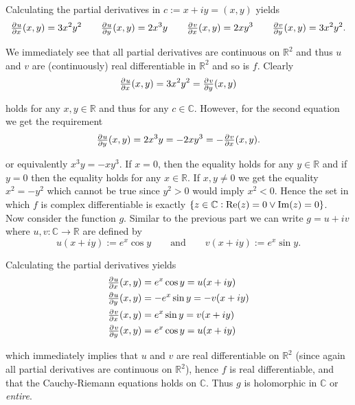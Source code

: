 \begin{enumerate}[label = \textbf{Exercise \arabic*.},wide = 0pt, itemsep=1.5ex]
	Calculating the partial derivatives in $c := x + iy = (x,y)$ yields
	\begin{equation*}
		\pd{u}{x}(x,y) = 3x^2y^2 \qquad \pd{u}{y}(x,y) = 2x^3y \qquad \pd{v}{x}(x,y) = 2xy^3 \qquad \pd{v}{y}(x,y) = 3x^2 y^2.
	\end{equation*}

	We immediately see that all partial derivatives are continuous on $\mathbb{R}^2$ and thus $u$ and $v$ are (continuously) real differentiable in $\mathbb{R}^2$ and so is $f$. Clearly 
	\begin{equation}
		\pd{u}{x}(x,y) = 3x^2 y^2 = \pd{v}{y}(x,y)
	\end{equation}

	\noindent holds for any $x,y \in \mathbb{R}$ and thus for any $c \in \mathbb{C}$. However, for the second equation we get the requirement
	\begin{equation}
		\pd{u}{y}(x,y) = 2x^3y = -2xy^3 = -\pd{v}{x}(x,y). 
	\end{equation}

	\noindent or equivalently $x^3y = -xy^3$. If $x = 0$, then the equality holds for any $y \in \mathbb{R}$ and if $y = 0$ then the equality holds for any $x \in \mathbb{R}$. If $x,y \neq 0$ we get the equality $x^2 = -y^2$ which cannot be true since $y^2 > 0$ would imply $x^2 < 0$. Hence the set in which $f$ is complex differentiable is exactly $\cbr[0]{z \in \mathbb{C} : \Re(z) = 0 \vee \Im(z) = 0}$.\\
	Now consider the function $g$. Similar to the previous part we can write $g = u + iv$ where $u,v: \mathbb{C} \to \mathbb{R}$ are defined by 
	\begin{equation}
		u(x + iy) := e^x\cos y \qquad \text{and} \qquad v(x + iy) := e^x \sin y.	
	\end{equation}

	Calculating the partial derivatives yields
	\begin{align*}
		\pd{u}{x}(x,y) &= e^x\cos y = u(x + iy)\\
		\pd{u}{y}(x,y) &= -e^x\sin y = -v(x + iy)\\
		\pd{v}{x}(x,y) &= e^x\sin y = v(x + iy)\\
		\pd{v}{y}(x,y) &= e^x\cos y = u(x + iy)
	\end{align*}

	\noindent which immediately implies that $u$ and $v$ are real differentiable on $\mathbb{R}^2$ (since again all partial derivatives are continuous on $\mathbb{R}^2$), hence $f$ is real differentiable, and that the Cauchy-Riemann equations holds on $\mathbb{C}$. Thus $g$ is holomorphic in $\mathbb{C}$ or \emph{entire}.

\end{enumerate}
\printbibliography

